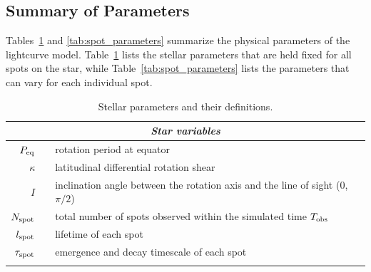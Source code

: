 \documentclass[preprint]{aastex702}
\begin{document}
\subsection{Summary of Parameters}

Tables~\ref{tab:star_parameters} and \ref{tab:spot_parameters} summarize the physical parameters of the lightcurve model. Table~\ref{tab:star_parameters} lists the stellar parameters that are held fixed for all spots on the star, while Table~\ref{tab:spot_parameters} lists the parameters that can vary for each individual spot.

\begin{center}
    \begin{longtable}{rcl} 
    \hline
        \multicolumn{3}{c}{\textit{Star variables}} \\
    \hline
        $P_{\rm eq}$        &&  rotation period at equator \\
        $\kappa$            &&  latitudinal differential rotation shear \\
        $I$                 &&  inclination angle between the rotation axis and the line of sight ($0$, $\pi/2$) \\
        $N_{\rm spot}$      &&  total number of spots observed within the simulated time $T_{\rm obs}$ \\
        $l_{\rm spot}$      &&  lifetime of each spot \\
        $\tau_{\rm spot}$   &&  emergence and decay timescale of each spot  \\
    \hline
    \caption{Stellar parameters and their definitions.}
    \label{tab:star_parameters}
    \end{longtable} 
\end{center}
\end{document}
